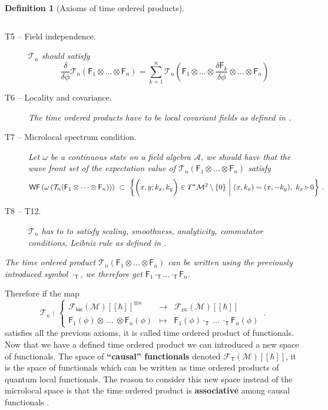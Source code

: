 \documentclass[11pt]{book}
\newcommand{\WF}{\mathsf{WF}}
\newcommand{\loc}{\mathsf{loc}}
\newcommand{\muc}{\mu\csf}
\newcommand{\Acal}{\mathcal{A}}
\newcommand{\Fcal}{\mathcal{F}}
\newcommand{\Mcal}{\mathcal{M}}
\newcommand{\Tcal}{\mathcal{T}}
\newcommand{\Fsf}{\mathsf{F}}
\newcommand{\Tsf}{\mathsf{T}}
\newcommand{\csf}{\mathsf{c}}
\theoremstyle{break}
\newtheorem{definition}{Definition}[chapter]
\begin{document}
\begin{definition}[Axioms of time ordered products]
\begin{description}
\begin{equation*}
\end{equation*}
%
\item[T5 -- Field independence.]\label{item:T5} $\Tcal_n$ should satisfy
%
\begin{equation*}
\frac{\delta}{\delta\phi} \Tcal_n(\Fsf_1\otimes\dots\otimes\Fsf_n) = \sum_{k=1}^n \Tcal_n\left(\Fsf_1\otimes\dots\otimes \frac{\delta\Fsf_k}{\delta\phi} \otimes\dots\otimes\Fsf_n\right)
\end{equation*}
%
\item[T6 -- Locality and covariance.]\label{item:T6} The time ordered products have to be local covariant fields as defined in \cite{HW_2001}.
%
\item[T7 -- Microlocal spectrum condition.]\label{item:T7} Let $\omega$ be a continuous state on a field algebra $\Acal$, we should have that the wave front set of the expectation value of $\Tcal_n(\Fsf_1\otimes\dots\otimes\Fsf_n)$ satisfy 
%
\begin{equation*}
\WF\left(\omega\left(\Tcal_n(\Fsf_1\otimes\dots\otimes\Fsf_n)\right)\right) \ \subset \ \bigg\{ \bigg( x, y ; k_x, k_y \bigg) \in T^\ast\Mcal^2 \setminus \{0\} \ \bigg| \ (x,k_x) \sim (x,-k_y), \ k_x \triangleright 0 \bigg\} \ .
\vspace*{-10pt}
\end{equation*}
%
\item[T8 -- T12.]\label{item:T8_T12} $\Tcal_n$ has to to satisfy scaling, smoothness, analyticity, commutator conditions, Leibniz rule as defined in \cite{HW_2001,HW_2002,HW_2005}.
\end{description}
%
The time ordered product $\Tcal_n(\Fsf_1\otimes\dots\otimes\Fsf_n)$ can be written using the previously introduced symbol $\cdot_\Tsf$, we therefore get $\Fsf_1\cdot_\Tsf\dots\cdot_\Tsf\Fsf_n$. 
\end{definition}

Therefore if the map
%
\begin{equation*}
\Tcal_n \ : \ 
\left\{
\begin{array}{lcl}
\Fcal_{\loc}(\Mcal)[[\hbar]]^{\otimes n} & \to & \Fcal_{\muc}(\Mcal)[[\hbar]] \\
\Fsf_1(\phi) \otimes \ ... \ \otimes \Fsf_n(\phi) & \mapsto & \Fsf_1(\phi) \cdot_{\Tsf} \ ... \ \cdot_{\Tsf} \Fsf_n(\phi)
\end{array}
\right. \ .
\end{equation*}
%
satisfies all the previous axioms, it is called time ordered product of functionals. Now that we have a defined time ordered product we can introduced a new space of functionals.  The space of \textbf{``causal'' functionals} denoted $\Fcal_\Tsf(\Mcal)[[\hbar]]$, it is the space of functionals which can be written as time ordered products of quantum local functionals. The reason to consider this new space instead of the microlocal space is that the time ordered product is \textbf{associative} among causal functionals \cite{FR_2013}.
\end{document}

